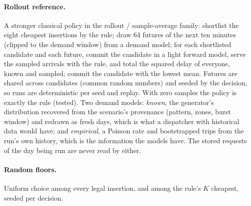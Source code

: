 \documentclass[11pt]{article}
\begin{document}
\paragraph{Rollout reference.} A stronger classical policy in the rollout / sample-average family: shortlist the eight cheapest insertions by the rule; draw 64 futures of the next ten minutes (clipped to the demand window) from a demand model; for each shortlisted candidate and each future, commit the candidate in a light forward model, serve the sampled arrivals with the rule, and total the squared delay of everyone, known and sampled; commit the candidate with the lowest mean. Futures are shared across candidates (common random numbers) and seeded by the decision, so runs are deterministic per seed and replay. With zero samples the policy is exactly the rule (tested). Two demand models: \emph{known}, the generator's distribution recovered from the scenario's provenance (pattern, zones, burst window) and redrawn as fresh days, which is what a dispatcher with historical data would have; and \emph{empirical}, a Poisson rate and bootstrapped trips from the run's own history, which is the information the models have. The stored requests of the day being run are never read by either.

\paragraph{Random floors.} Uniform choice among every legal insertion, and among the rule's $K$ cheapest, seeded per decision.
\end{document}
